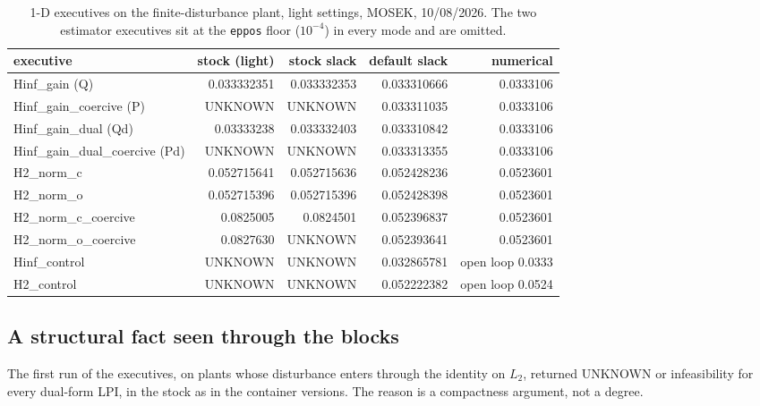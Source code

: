 \documentclass[12pt]{article}
\newcommand{\code}[1]{\texttt{#1}}
\theoremstyle{plain}
\theoremstyle{definition}
\theoremstyle{remark}
\begin{document}
\begin{table}[h]\centering\footnotesize
\setlength{\tabcolsep}{5pt}
\begin{tabular}{lrrrr}
\toprule
executive & stock (light) & stock slack & default slack & numerical \\
\midrule
Hinf\_gain (Q) & 0.033332351 & 0.033332353 & 0.033310666 & 0.0333106 \\
Hinf\_gain\_coercive (P) & UNKNOWN & UNKNOWN & 0.033311035 & 0.0333106 \\
Hinf\_gain\_dual (Qd) & 0.03333238 & 0.033332403 & 0.033310842 & 0.0333106 \\
Hinf\_gain\_dual\_coercive (Pd) & UNKNOWN & UNKNOWN & 0.033313355 & 0.0333106 \\
H2\_norm\_c & 0.052715641 & 0.052715636 & 0.052428236 & 0.0523601 \\
H2\_norm\_o & 0.052715396 & 0.052715396 & 0.052428398 & 0.0523601 \\
H2\_norm\_c\_coercive & 0.0825005 & 0.0824501 & 0.052396837 & 0.0523601 \\
H2\_norm\_o\_coercive & 0.0827630 & UNKNOWN & 0.052393641 & 0.0523601 \\
Hinf\_control & UNKNOWN & UNKNOWN & 0.032865781 & open loop 0.0333 \\
H2\_control & UNKNOWN & UNKNOWN & 0.052222382 & open loop 0.0524 \\
\bottomrule
\end{tabular}
\caption{1-D executives on the finite-disturbance plant, light settings, MOSEK, 10/08/2026. The two estimator executives sit at the \code{eppos} floor ($10^{-4}$) in every mode and are omitted.}\label{tab:bracket}
\end{table}

\subsection{A structural fact seen through the blocks}

The first run of the executives, on plants whose disturbance enters through the identity on $L_2$, returned UNKNOWN or infeasibility for every dual-form LPI, in the stock as in the container versions. The reason is a compactness argument, not a degree.
\end{document}
